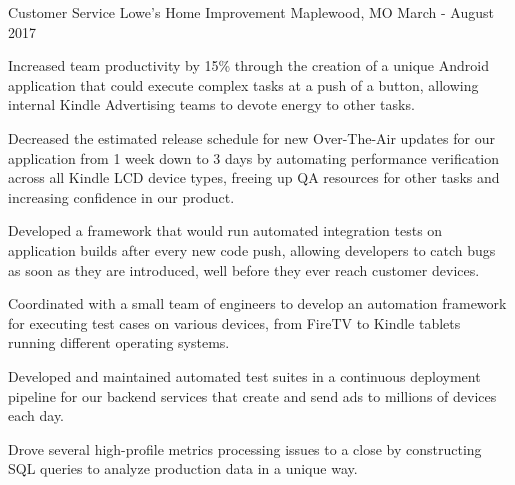 

\begin{cventries}

  \cventry
    {Customer Service} %
    {Lowe's Home Improvement} %
    {Maplewood, MO} %
    {March - August 2017} %
    {
      \begin{cvitems} %
        \item {Increased team productivity by 15\% through the creation of a unique Android application that could execute complex tasks at a push of a button, allowing internal Kindle Advertising teams to devote energy to other tasks.}
        \item {Decreased the estimated release schedule for new Over-The-Air updates for our application from 1 week down to 3 days by automating performance verification across all Kindle LCD device types, freeing up QA resources for other tasks and increasing confidence in our product.}
	\item {Developed a framework that would run automated integration tests on application builds after every new code push, allowing developers to catch bugs as soon as they are introduced, well before they ever reach customer devices.}
        \item {Coordinated with a small team of engineers to develop an automation framework for executing test cases on various devices, from FireTV to Kindle tablets running different operating systems.}
        \item {Developed and maintained automated test suites in a continuous deployment pipeline for our backend services that create and send ads to millions of devices each day.}
        \item {Drove several high-profile metrics processing issues to a close by constructing SQL queries to analyze production data in a unique way.}
      \end{cvitems}
    }

\end{cventries}
